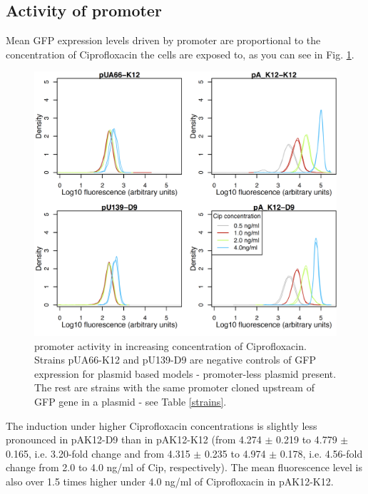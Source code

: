 \subsection{Activity of  promoter}
Mean GFP expression levels driven by  promoter are proportional to the concentration of Ciprofloxacin the cells are exposed to, as you can see in Fig. \ref{recAassay}.
\begin{figure}[ht!]
  \centering
  \includegraphics[scale=0.25]{text/Pictures/recAassay.png}
	\caption{ promoter activity in increasing concentration of Ciprofloxacin. Strains pUA66-K12 and pU139-D9 are negative controls of GFP expression for plasmid based models - promoter-less plasmid present. The rest are strains with the same  promoter cloned upstream of GFP gene in a plasmid - see Table \ref{strains}.}
	\label{recAassay}
\end{figure}
The induction under higher Ciprofloxacin concentrations is slightly less pronounced in pA\textunderscore K12-D9 than in pA\textunderscore K12-K12 (from 4.274 $\pm$ 0.219 to 4.779 $\pm$ 0.165, i.e. 3.20-fold change and from 4.315 $\pm$ 0.235 to 4.974 $\pm$ 0.178, i.e. 4.56-fold change from 2.0 to 4.0 ng/ml of Cip, respectively).
The mean fluorescence level is also over 1.5 times higher under 4.0 ng/ml of Ciprofloxacin in pA\textunderscore K12-K12.

